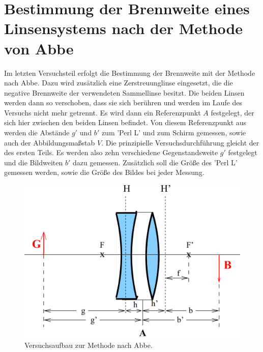 \section{Bestimmung der Brennweite eines Linsensystems nach der Methode von Abbe}
Im letzten Versuchsteil erfolgt die Bestimmung der Brennweite mit der Methode nach Abbe. Dazu wird zusätzlich eine Zerstreuunglinse eingesetzt, die die negative Brennweite der verwendeten Sammellinse besitzt. Die beiden Linsen 
werden dann so verschoben, dass sie sich berühren und werden im Laufe des Versuchs nicht mehr getrennt. Es wird dann ein Referenzpunkt $A$ festgelegt, der sich hier zwischen den beiden Linsen befindet. Von diesem Referenzpunkt 
aus werden die Abstände $g'$ und $b'$ zum 'Perl L' und zum Schirm gemessen, sowie auch der Abbildungsmaßstab $V$. Die prinzipielle Versuchsdurchführung gleicht der des ersten Teils. Es werden also zehn verschiedene Gegenstandsweite $g'$ 
festgelegt und die Bildweiten $b'$ dazu gemessen. Zusätzlich soll die Größe des 'Perl L' gemessen werden, sowie die Größe des Bildes bei jeder Messung.

\begin{figure}[h!tbp]
	\centering
	\includegraphics[width=0.6\linewidth]{aufbau2.png}
	\caption{Versuchsaufbau zur Methode nach Abbe.\cite[5]{anleitung408}}
	\label{fig:aufbau2}
\end{figure}

